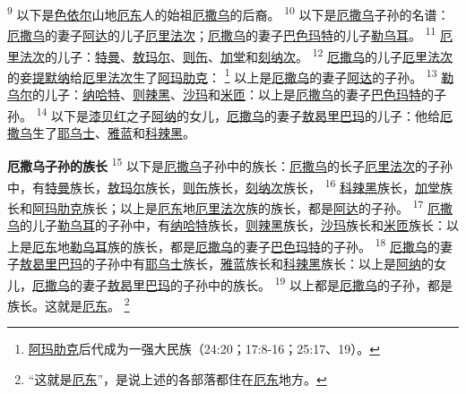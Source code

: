 \textsuperscript{9}
以下是\uline{色依尔}山地\uline{厄东}人的始祖\uline{厄撒乌}的后裔。
\textsuperscript{10}
以下是\uline{厄撒乌}子孙的名谱：\uline{厄撒乌}的妻子\uline{阿达}的儿子\uline{厄里}\uline{法次}；\uline{厄撒乌}的妻子\uline{巴色}\uline{玛特}的儿子\uline{勒乌耳}。
\textsuperscript{11}
\uline{厄里}\uline{法次}的儿子：\uline{特曼}、\uline{敖玛尔}、\uline{则缶}、\uline{加堂}和\uline{刻纳次}。
\textsuperscript{12}
\uline{厄撒乌}的儿子\uline{厄里}\uline{法次}的妾\uline{提默纳}给\uline{厄里}\uline{法次}生了\uline{阿玛肋克}：
\footnote{\uline{阿玛肋克}后代成为一强大民族（24:20；17:8-16；25:17、19）。}
以上是\uline{厄撒乌}的妻子\uline{阿达}的子孙。
\textsuperscript{13}
\uline{勒乌尔}的儿子：\uline{纳哈特}、\uline{则辣黑}、\uline{沙玛}和\uline{米匝}：以上是\uline{厄撒乌}的妻子\uline{巴色}\uline{玛特}的子孙。
\textsuperscript{14}
以下是\uline{漆贝红}之子\uline{阿纳}的女儿，\uline{厄撒乌}的妻子\uline{敖曷里}\uline{巴玛}的儿子：他给\uline{厄撒乌}生了\uline{耶乌士}、\uline{雅蓝}和\uline{科辣黑}。

\textbf{厄撒乌子孙的族长}
\textsuperscript{15}
以下是\uline{厄撒乌}子孙中的族长：\uline{厄撒乌}的长子\uline{厄里}\uline{法次}的子孙中，有\uline{特曼}族长，\uline{敖玛尔}族长，\uline{则缶}族长，\uline{刻纳次}族长，
\textsuperscript{16}
\uline{科辣黑}族长，\uline{加堂}族长和\uline{阿玛}\uline{肋克}族长；以上是\uline{厄东}地\uline{厄里}\uline{法次}族的族长，都是\uline{阿达}的子孙。
\textsuperscript{17}
\uline{厄撒乌}的儿子\uline{勒乌耳}的子孙中，有\uline{纳哈特}族长，\uline{则辣黑}族长，\uline{沙玛}族长和\uline{米匝}族长：以上是\uline{厄东}地\uline{勒乌耳}族的族长，都是\uline{厄撒乌}的妻子\uline{巴色}\uline{玛特}的子孙。
\textsuperscript{18}
\uline{厄撒乌}的妻子\uline{敖曷里}\uline{巴玛}的子孙中有\uline{耶乌士}族长，\uline{雅蓝}族长和\uline{科辣黑}族长：以上是\uline{阿纳}的女儿，\uline{厄撒乌}的妻子\uline{敖曷里}\uline{巴玛}的子孙中的族长。
\textsuperscript{19}
以上都是\uline{厄撒乌}的子孙，都是族长。这就是\uline{厄东}。
\footnote{“这就是\uline{厄东}”，是说上述的各部落都住在\uline{厄东}地方。}

